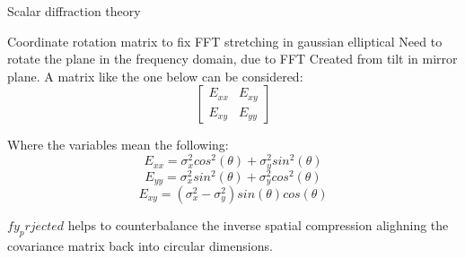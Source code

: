 \documentclass[twoside]{article}
\begin{document}
Scalar diffraction theory





Coordinate rotation matrix to fix FFT stretching in gaussian elliptical
Need to rotate the plane in the frequency domain, due to FFT
Created from tilt in mirror plane. 
A matrix like the one below can be considered:
\begin{equation}
    \begin{bmatrix}
        E_{xx} & E_{xy}\\
        E_{xy} & E_{yy}
    \end{bmatrix}
\end{equation}

Where the variables mean the following:
\begin{equation}
    E_{xx} = \sigma_{x}^2 cos^2(\theta) + \sigma_{y}^2 sin^2(\theta)
\end{equation}
\begin{equation}
    E_{yy} = \sigma_{x}^2 sin^2(\theta) + \sigma_{y}^2 cos^2(\theta)
\end{equation}
\begin{equation}
    E_{xy} = (\sigma_{x}^2 - \sigma_{y}^2) sin(\theta) cos(\theta)
\end{equation}

$fy_prjected$ helps to counterbalance the inverse spatial compression alighning the covariance matrix back into circular dimensions.


\end{document}
